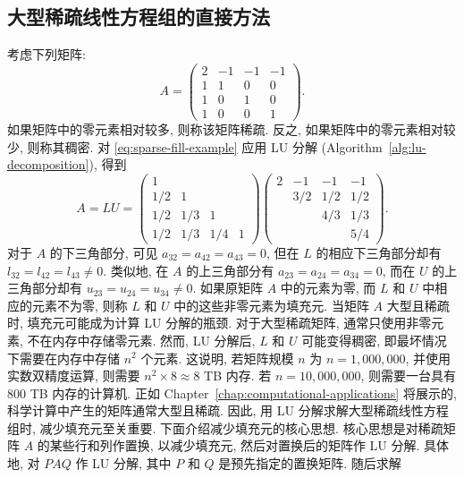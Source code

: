 \subsection{{大型稀疏线性方程组的直接方法}}\label{sec:sparse-direct-methods}
{考虑下列矩阵:}
\begin{equation}\label{eq:sparse-fill-example}
A=\begin{pmatrix}2&-1&-1&-1\\1&1&0&0\\1&0&1&0\\1&0&0&1\end{pmatrix}.
\end{equation}
{如果矩阵中的零元素相对较多, 则称该矩阵稀疏. 反之, 如果矩阵中的零元素相对较少, 则称其稠密.}
{对 \eqref{eq:sparse-fill-example} 应用 LU 分解 (Algorithm~\ref{alg:lu-decomposition}), 得到}
\[
A=LU=
\begin{pmatrix}1&&&\\1/2&1&&\\1/2&1/3&1&\\1/2&1/3&1/4&1\end{pmatrix}
\begin{pmatrix}2&-1&-1&-1\\&3/2&1/2&1/2\\&&4/3&1/3\\&&&5/4\end{pmatrix}.
\]
{对于 $A$ 的下三角部分, 可见 $a_{32}=a_{42}=a_{43}=0$, 但在 $L$ 的相应下三角部分却有 $l_{32}=l_{42}=l_{43}\ne0$. 类似地, 在 $A$ 的上三角部分有 $a_{23}=a_{24}=a_{34}=0$, 而在 $U$ 的上三角部分却有 $u_{23}=u_{24}=u_{34}\ne0$. 如果原矩阵 $A$ 中的元素为零, 而 $L$ 和 $U$ 中相应的元素不为零, 则称 $L$ 和 $U$ 中的这些非零元素为填充元.}
{当矩阵 $A$ 大型且稀疏时, 填充元可能成为计算 LU 分解的瓶颈. 对于大型稀疏矩阵, 通常只使用非零元素, 不在内存中存储零元素. 然而, LU 分解后, $L$ 和 $U$ 可能变得稠密, 即最坏情况下需要在内存中存储 $n^2$ 个元素. 这说明, 若矩阵规模 $n$ 为 $n=1,000,000$, 并使用实数双精度运算, 则需要 $n^2\times8\approx8$ TB 内存. 若 $n=10,000,000$, 则需要一台具有 800 TB 内存的计算机.}
{正如 Chapter~\ref{chap:computational-applications} 将展示的, 科学计算中产生的矩阵通常大型且稀疏. 因此, 用 LU 分解求解大型稀疏线性方程组时, 减少填充元至关重要. 下面介绍减少填充元的核心思想.}
{核心思想是对稀疏矩阵 $A$ 的某些行和列作置换, 以减少填充元, 然后对置换后的矩阵作 LU 分解. 具体地, 对 $PAQ$ 作 LU 分解, 其中 $P$ 和 $Q$ 是预先指定的置换矩阵. 随后求解}
